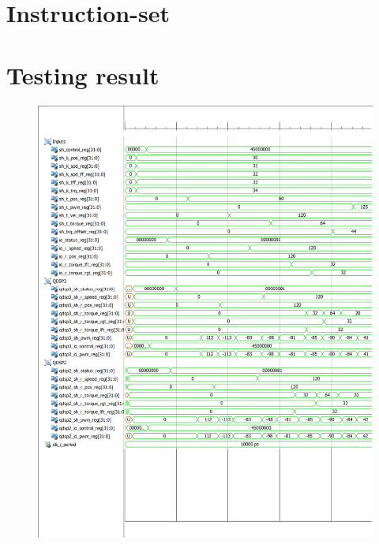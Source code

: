 \documentclass[a4paper,10pt,oneside]{memoir}
\numberwithin{figure}{section}
\numberwithin{equation}{section}
\numberwithin{table}{section}
\numberwithin{lstlisting}{section}}
\begin{document}
\setcounter{page}{0}


\tableofcontents*









%
%

\appendix

\chapter{Instruction-set}
\label{app:instruction-set}
\begin{table}[h]
	\centering
		
\end{table}

\chapter{Testing result}
\label{app:testresults}
  \begin{figure}[ht]
	\centering
	\includegraphics[width=\textwidth]{pictures/results.pdf} 
  \end{figure}
\end{document}

